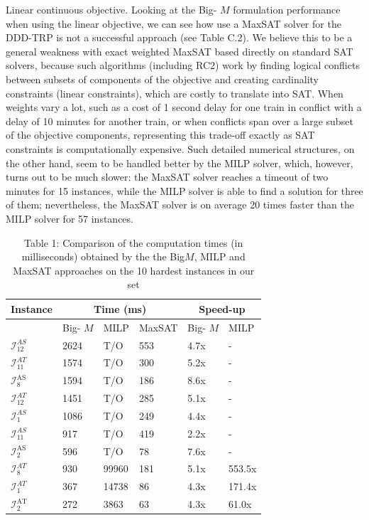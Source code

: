 \documentclass[10pt]{article}
\begin{document}
Linear continuous objective. Looking at the Big- $M$ formulation performance when using the linear objective, we can see how use a MaxSAT solver for the DDD-TRP is not a successful approach (see Table C.2). We believe this to be a general weakness with exact weighted MaxSAT based directly on standard SAT solvers, because such algorithms (including RC2) work by finding logical conflicts between subsets of components of the objective and creating cardinality constraints (linear constraints), which are costly to translate into SAT. When weights vary a lot, such as a cost of 1 second delay for one train in conflict with a delay of 10 minutes for another train, or when conflicts span over a large subset of the objective components, representing this trade-off exactly as SAT constraints is computationally expensive. Such detailed numerical structures, on the other hand, seem to be handled better by the MILP solver, which, however, turns out to be much slower: the MaxSAT solver reaches a timeout of two minutes for 15 instances, while the MILP solver is able to find a solution for three of them; nevertheless, the MaxSAT solver is on average 20 times faster than the MILP solver for 57 instances.

\begin{table}[h]
\begin{center}
\captionsetup{labelformat=empty}
\caption{Table 1: Comparison of the computation times (in milliseconds) obtained by the the Big$M$, MILP and MaxSAT approaches on the 10 hardest instances in our set}
\begin{tabular}{|l|l|l|l|l|l|}
\hline
\multirow[b]{2}{*}{Instance} & \multicolumn{3}{|c|}{Time (ms)} & \multicolumn{2}{|c|}{Speed-up} \\
\hline
 & Big- $M$ & MILP & MaxSAT & Big- $M$ & MILP \\
\hline
$\mathcal{I}_{12}^{A S}$ & 2624 & T/O & 553 & 4.7x & - \\
\hline
$\mathcal{I}_{11}^{A T}$ & 1574 & T/O & 300 & 5.2x & - \\
\hline
$\mathcal{I}_{8}^{\text {AS }}$ & 1594 & T/O & 186 & 8.6x & - \\
\hline
$\mathcal{I}_{12}^{A T}$ & 1451 & T/O & 285 & 5.1x & - \\
\hline
$\mathcal{I}_{1}^{A S}$ & 1086 & T/O & 249 & 4.4x & - \\
\hline
$\mathcal{I}_{11}^{A S}$ & 917 & T/O & 419 & 2.2x & - \\
\hline
$\mathcal{I}_{2}^{\text {AS }}$ & 596 & T/O & 78 & 7.6x & - \\
\hline
$\mathcal{I}_{8}^{A T}$ & 930 & 99960 & 181 & 5.1x & 553.5x \\
\hline
$\mathcal{I}_{1}^{A T}$ & 367 & 14738 & 86 & 4.3x & 171.4x \\
\hline
$\mathcal{I}_{2}^{\text {AT }}$ & 272 & 3863 & 63 & 4.3x & 61.0x \\
\hline
\end{tabular}
\end{center}
\end{table}
\end{document}
